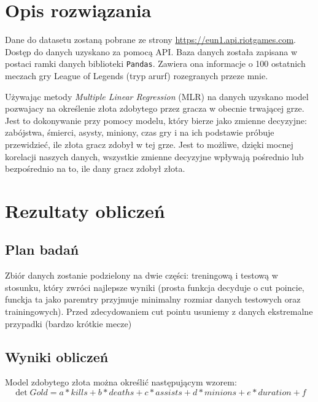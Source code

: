 \documentclass[10pt]{article}
\begin{document}
\section{Opis rozwiązania}

Dane do datasetu zostaną pobrane ze strony \url{https://eun1.api.riotgames.com}. Dostęp do danych uzyskano za pomocą API. Baza danych została zapisana w postaci ramki danych biblioteki \texttt{Pandas}. Zawiera ona informacje o 100 ostatnich meczach gry League of Legends (tryp arurf) rozegranych przeze mnie. 

Używając metody \textit{Multiple Linear Regression} (MLR) na danych uzyskano model pozwajacy na określenie złota zdobytego przez gracza w obecnie trwającej grze. Jest to dokonywanie przy pomocy modelu, który bierze jako zmienne decyzyjne: zabójstwa, śmierci, asysty, miniony, czas gry i na ich podstawie próbuje przewidzieć, ile złota gracz zdobył w tej grze. Jest to możliwe, dzięki mocnej korelacji naszych danych, wszystkie zmienne decyzyjne wpływają pośrednio lub bezpośrednio na to, ile dany gracz zdobył złota.

\section{Rezultaty obliczeń}

\subsection{Plan badań}
Zbiór danych zostanie podzielony na dwie części: treningową i testową w stosunku, który zwróci najlepsze wyniki (prosta funkcja decyduje o cut poincie, funckja ta jako paremtry przyjmuje minimalny rozmiar danych testowych oraz trainingowych). Przed zdecydowaniem cut pointu usuniemy z danych ekstremalne przypadki (bardzo krótkie mecze)

\subsection{Wyniki obliczeń} 
Model zdobytego złota można określić następującym wzorem:
\begin{equation}
\det Gold = a * kills + b * deaths + c * assists + d * minions + e * duration + f
\label{eq:wzor_wazny}
\end{equation}
\end{document}
